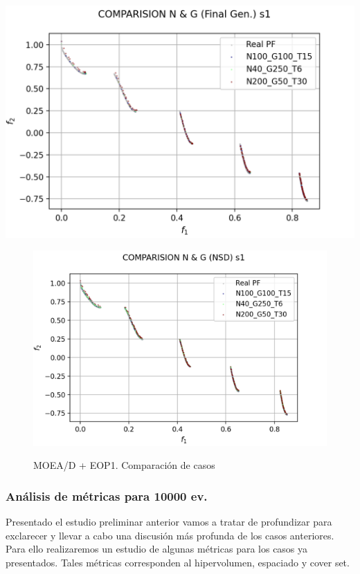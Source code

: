\begin{center}
\includegraphics[scale=0.9]{figures/COMPARISIONS_EOP1/GCOMP_FGEN_s1.png}\\
\end{center}
\begin{figure}[H]
\centering
\includegraphics[scale=0.9]{figures/COMPARISIONS_EOP1/GCOMP_NDS_s1.png}\\
\caption{MOEA/D + EOP1. Comparación de casos}
\label{fig:5}
\end{figure}



\subsubsection{Análisis de métricas para 10000 ev.}

Presentado el estudio preliminar anterior vamos a tratar de profundizar para exclarecer y llevar a cabo una discusión más profunda de los casos anteriores. Para ello realizaremos un estudio de algunas métricas para los casos ya presentados. Tales métricas corresponden al hipervolumen, espaciado y cover set.\\

